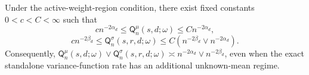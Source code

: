 Under the active-weight-region condition, there exist fixed constants \(0<c<C<\infty\) such that \[c n^{-2\alpha_d}\le\mathsf Q_n^{\mu}(s,d;\omega)\le C n^{-2\alpha_d},\] \[c n^{-2\beta_d}\le\mathsf Q_n^{\sigma}(s,r,d;\omega)\le C\left(n^{-2\beta_d}\vee n^{-2\alpha_d}\right).\] Consequently, \(\mathsf Q_n^{\mu}(s,d;\omega)\vee\mathsf Q_n^{\sigma}(s,r,d;\omega)\asymp n^{-2\alpha_d}\vee n^{-2\beta_d}\), even when the exact standalone variance-function rate has an additional unknown-mean regime.